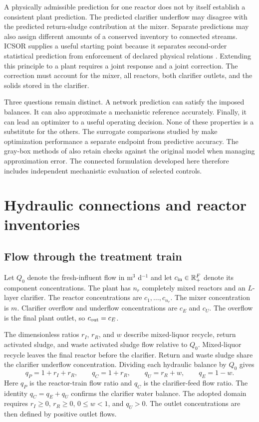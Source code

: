 A physically admissible prediction for one reactor does not by itself establish a consistent plant prediction. The predicted clarifier underflow may disagree with the predicted return-sludge contribution at the mixer. Separate predictions may also assign different amounts of a conserved inventory to connected streams. ICSOR supplies a useful starting point because it separates second-order statistical prediction from enforcement of declared physical relations \citep{Selerio2026}. Extending this principle to a plant requires a joint response and a joint correction. The correction must account for the mixer, all reactors, both clarifier outlets, and the solids stored in the clarifier.

Three questions remain distinct. A network prediction can satisfy the imposed balances. It can also approximate a mechanistic reference accurately. Finally, it can lead an optimizer to a useful operating decision. None of these properties is a substitute for the others. The surrogate comparisons studied by \citet{Pedrozo2025} make optimization performance a separate endpoint from predictive accuracy. The gray-box methods of \citet{Hameed2026} also retain checks against the original model when managing approximation error. The connected formulation developed here therefore includes independent mechanistic evaluation of selected controls.

\section{Hydraulic connections and reactor inventories}

\subsection{Flow through the treatment train}

Let $Q_0$ denote the fresh-influent flow in m$^3$ d$^{-1}$ and let $c_{\rm in}\in\mathbb R_+^F$ denote its component concentrations. The plant has $n_r$ completely mixed reactors and an $L$-layer clarifier. The reactor concentrations are $c_1,\ldots,c_{n_r}$. The mixer concentration is $m$. Clarifier overflow and underflow concentrations are $c_E$ and $c_U$. The overflow is the final plant outlet, so $c_{\rm out}=c_E$.

The dimensionless ratios $r_I$, $r_R$, and $w$ describe mixed-liquor recycle, return activated sludge, and waste activated sludge flow relative to $Q_0$. Mixed-liquor recycle leaves the final reactor before the clarifier. Return and waste sludge share the clarifier underflow concentration. Dividing each hydraulic balance by $Q_0$ gives
\begin{equation}
q_P=1+r_I+r_R,\qquad q_C=1+r_R,\qquad
q_U=r_R+w,\qquad q_E=1-w.
\label{eq:plant_flows}
\end{equation}
Here $q_P$ is the reactor-train flow ratio and $q_C$ is the clarifier-feed flow ratio. The identity $q_C=q_E+q_U$ confirms the clarifier water balance. The adopted domain requires $r_I\ge0$, $r_R\ge0$, $0\le w<1$, and $q_U>0$. The outlet concentrations are then defined by positive outlet flows.

